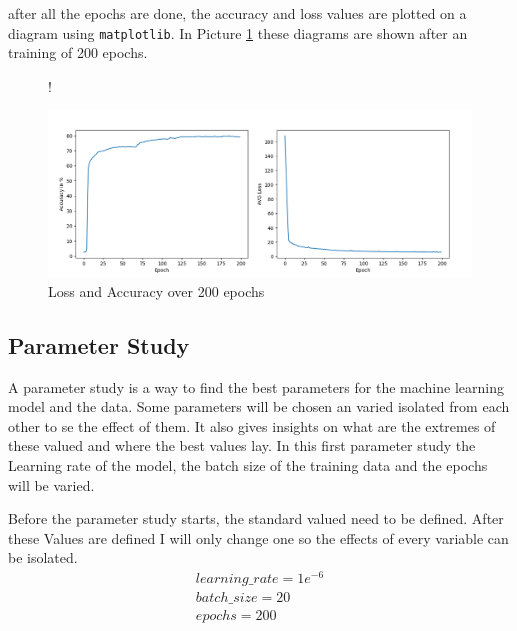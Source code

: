\documentclass[a4paper, 12pt, oneside]{scrbook}
\begin{document}
				\noindent after all the epochs are done, the accuracy and loss values are plotted on a diagram using \texttt{matplotlib}. In Picture \ref{fig:lossAndAccuracy} these diagrams are shown after an training of 200 epochs.
				
				\begin{figure} [H]
					\centering
					\resizebox{\linewidth} {!} {
						\includegraphics{res/firstEDA/lossAndAccuracy.png}
						
					}
					\caption{Loss and Accuracy over 200 epochs}
					\label{fig:lossAndAccuracy}
				\end{figure}
			
			\subsection{Parameter Study}\label{paramStudy}
			
				\noindent A parameter study is a way to find the best parameters for the machine learning model and the data. Some parameters will be chosen an varied isolated from each other to se the effect of them. It also gives insights on what are the extremes of these valued and where the best values lay. In this first parameter study the Learning rate of the model, the batch size of the training data and the epochs will be varied. 
				
				\noindent Before the parameter study starts, the standard valued need to be defined. After these Values are defined I will only change one so the effects of every variable can be isolated. 
				\begin{gather}
					learning\_rate = 1e^{-6}\\
					batch\_size = 20\\
					epochs = 200
				\end{gather}
				
\end{document}
